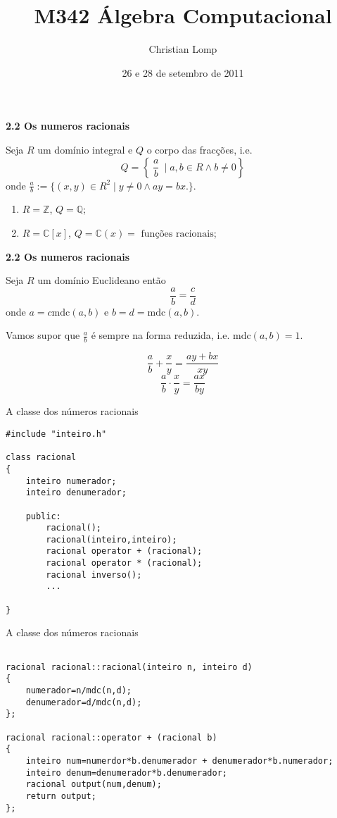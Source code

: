 \documentclass{beamer}
\title[M342]{M342 Álgebra Computacional}
\author{Christian Lomp}
\institute{FCUP}
\date{26 e 28 de setembro de 2011}
\newcommand{\ZZ}{\mathbb Z}
\newcommand{\CC}{\mathbb C}
\newcommand{\QQ}{\mathbb Q}
\newcommand{\mdc}[2]{\mathrm{mdc}({#1}, {#2})}
\begin{document}
\begin{frame}
\titlepage
\end{frame}






\begin{frame}{\bf 2.2 Os numeros racionais} 

Seja $R$ um domínio integral e $Q$ o corpo das fracções, i.e.
$$Q= \left\{ \: \frac{a}{b} \: \mid a,b\in R \wedge b\neq 0 \right\}$$
onde $\frac{a}{b} := \{ (x,y) \in R^2 \mid y\neq 0 \wedge ay=bx.\}$.
\pause

\begin{enumerate}
\item $R=\ZZ$, $Q=\QQ$;
\item $R=\CC[x]$, $Q=\CC(x) = \mbox{ funções racionais}$;
\end{enumerate}
\end{frame}

\begin{frame}{\bf 2.2 Os numeros racionais} 

Seja $R$ um domínio Euclideano então 
$$ \frac{a}{b} = \frac{c}{d}$$
onde $a=c\mdc{a}{b}$ e $b=d=\mdc{a}{b}.$

Vamos supor que $\frac{a}{b}$ é sempre na forma reduzida, i.e. $\mdc{a}{b}=1$.
\pause

$$\frac{a}{b} + \frac{x}{y} = \frac{ay+bx}{xy}$$
$$\frac{a}{b} \cdot \frac{x}{y} = \frac{ax}{by}$$


\end{frame}

\begin{frame}[fragile]{A classe dos números racionais}
\lstset{language=C++}
\begin{lstlisting}
#include "inteiro.h"

class racional
{
	inteiro numerador;
	inteiro denumerador;
	
	public: 
		racional();
		racional(inteiro,inteiro);
		racional operator + (racional);
		racional operator * (racional);
		racional inverso();
		...
	
}
\end{lstlisting}
\end{frame}



\begin{frame}[fragile]{A classe dos números racionais}
\lstset{language=C++}
\begin{lstlisting}

racional racional::racional(inteiro n, inteiro d)
{
	numerador=n/mdc(n,d);
	denumerador=d/mdc(n,d);
};

racional racional::operator + (racional b)
{
	inteiro num=numerdor*b.denumerador + denumerador*b.numerador;
	inteiro denum=denumerador*b.denumerador;
	racional output(num,denum);
	return output;
};


\end{lstlisting}
\end{frame}
\end{document}
